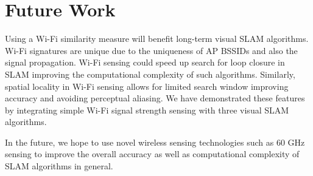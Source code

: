 \section{Future Work}\label{future}

Using a Wi-Fi similarity measure will benefit long-term visual SLAM algorithms. Wi-Fi signatures are unique due to the uniqueness of AP BSSIDs and also the signal propagation. Wi-Fi sensing could speed up search for loop closure in SLAM improving the computational complexity of such algorithms. Similarly, spatial locality in Wi-Fi sensing allows for limited search window improving accuracy and avoiding perceptual aliasing. We have demonstrated these features by integrating simple Wi-Fi signal strength sensing with three visual SLAM algorithms. 

In the future, we hope to use novel wireless sensing technologies such as 60 GHz sensing to improve the overall accuracy as well as computational complexity of SLAM algorithms in general. 

